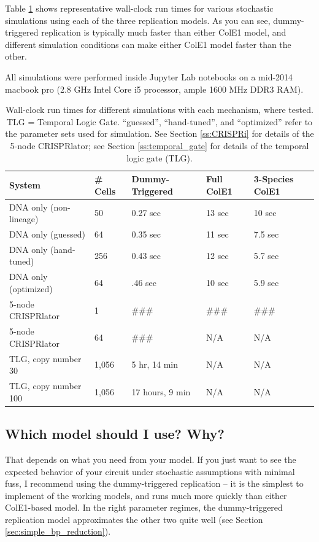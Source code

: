 \documentclass[preprint,12pt]{oldplainarticle}
\begin{document}
Table \ref{tab:speed} shows representative wall-clock run times for various stochastic simulations using each of the three replication models. As you can see, dummy-triggered replication is typically much faster than either ColE1 model, and different simulation conditions can make either ColE1 model faster than the other. 

All simulations were performed inside Jupyter Lab notebooks on a mid-2014 macbook pro (2.8 GHz Intel Core i5 processor, ample 1600 MHz DDR3 RAM). 

\begin{table}[hbt!]
\centering
\begin{tabular}{lllll}
\hline
System & \# Cells &  Dummy-Triggered & Full ColE1 & 3-Species ColE1\\
\hline
DNA only (non-lineage) &  50  & 0.27 sec & 13 sec & 10 sec\\
DNA only (guessed) & 64 & 0.35 sec & 11 sec & 7.5 sec \\
DNA only (hand-tuned) & 256 & 0.43 sec & 12 sec & 5.7 sec \\
DNA only (optimized) & 64 & .46 sec & 10 sec & 5.9 sec \\
5-node CRISPRlator & 1 & \#\#\# & \#\#\# & \#\#\# \\
5-node CRISPRlator & 64 & \#\#\# & N/A & N/A\\
TLG, copy number 30 & 1,056 & 5 hr, 14 min & N/A & N/A\\
TLG, copy number 100 & 1,056 & 17 hours, 9 min & N/A & N/A\\
\hline
\end{tabular}
\caption{Wall-clock run times for different simulations with each mechanism, where tested. TLG = Temporal Logic Gate. ``guessed'', ``hand-tuned'', and ``optimized'' refer to the parameter sets used for simulation. See Section \ref{ss:CRISPRi} for details of the 5-node CRISPRlator; see Section \ref{ss:temporal_gate} for details of the temporal logic gate (TLG).}
\label{tab:speed}
\end{table}

\subsection{Which model should I use? Why?}

That depends on what you need from your model. If you just want to see the expected behavior of your circuit under stochastic assumptions with minimal fuss, I recommend using the dummy-triggered replication -- it is the simplest to implement of the working models, and runs much more quickly than either ColE1-based model. In the right parameter regimes, the dummy-triggered replication model approximates the other two quite well (see Section \ref{sec:simple_bp_reduction}). 
\end{document}

